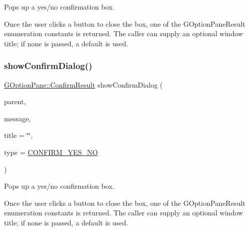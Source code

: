 Pops up a yes/no confirmation box. 

Once the user clicks a button to close the box, one of the G\+Option\+Pane\+Result enumeration constants is returned. The caller can supply an optional window title; if none is passed, a default is used. \mbox{\label{classGOptionPane_a25726b3ff4882c3a7ef9be5fd4c4f2ef}} 
\subsubsection{\texorpdfstring{show\+Confirm\+Dialog()}{showConfirmDialog()}\hspace{0.1cm}{\footnotesize\ttfamily [3/3]}}
{\footnotesize\ttfamily \mbox{\hyperlink{classGOptionPane_a1cc9e8685029e39646671ed71f32d47d}{G\+Option\+Pane\+::\+Confirm\+Result}} show\+Confirm\+Dialog (\begin{DoxyParamCaption}\item[{Q\+Widget $\ast$}]{parent,  }\item[{const std\+::string \&}]{message,  }\item[{const std\+::string \&}]{title = {\ttfamily \char`\"{}\char`\"{}},  }\item[{\mbox{\hyperlink{classGOptionPane_a6a1aaf19c06f5a6bef89ea6415547049}{Confirm\+Type}}}]{type = {\ttfamily \mbox{\hyperlink{classGOptionPane_a6a1aaf19c06f5a6bef89ea6415547049a964914d27eb73a202938a53f43adc4b1}{C\+O\+N\+F\+I\+R\+M\+\_\+\+Y\+E\+S\+\_\+\+NO}}} }\end{DoxyParamCaption})\hspace{0.3cm}{\ttfamily [static]}}



Pops up a yes/no confirmation box. 

Once the user clicks a button to close the box, one of the G\+Option\+Pane\+Result enumeration constants is returned. The caller can supply an optional window title; if none is passed, a default is used. \mbox{\label{classGOptionPane_a50fdc381453e6b8c495e3f9fe07b7bec}} 
